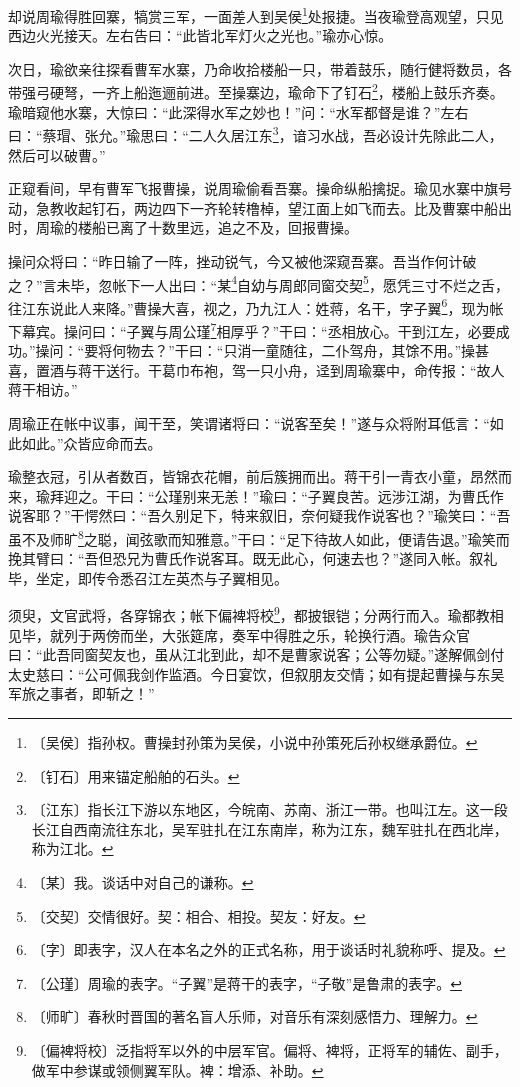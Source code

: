 \documentclass[12pt,UTF-8,openany]{ctexbook}
\begin{document}
\begin{normalsize}
    
    却说周瑜得胜回寨，犒赏三军，一面差人到吴侯\footnote{〔吴侯〕指孙权。曹操封孙策为吴侯，小说中孙策死后孙权继承爵位。}处报捷。当夜瑜登高观望，只见西边火光接天。左右告曰：“此皆北军灯火之光也。”瑜亦心惊。
    
    次日，瑜欲亲往探看曹军水寨，乃命收拾楼船一只，带着鼓乐，随行健将数员，各带强弓硬弩，一齐上船迤逦前进。至操寨边，瑜命下了钉石\footnote{〔钉石〕用来锚定船舶的石头。}，楼船上鼓乐齐奏。瑜暗窥他水寨，大惊曰：“此深得水军之妙也！”问：“水军都督是谁？”左右曰：“蔡瑁、张允。”瑜思曰：“二人久居江东\footnote{〔江东〕指长江下游以东地区，今皖南、苏南、浙江一带。也叫江左。这一段长江自西南流往东北，吴军驻扎在江东南岸，称为江东，魏军驻扎在西北岸，称为江北。}，谙习水战，吾必设计先除此二人，然后可以破曹。”
    
    正窥看间，早有曹军飞报曹操，说周瑜偷看吾寨。操命纵船擒捉。瑜见水寨中旗号动，急教收起钉石，两边四下一齐轮转橹棹，望江面上如飞而去。比及曹寨中船出时，周瑜的楼船已离了十数里远，追之不及，回报曹操。
    
    操问众将曰：“昨日输了一阵，挫动锐气，今又被他深窥吾寨。吾当作何计破之？”言未毕，忽帐下一人出曰：“某\footnote{〔某〕我。谈话中对自己的谦称。}自幼与周郎同窗交契\footnote{〔交契〕交情很好。契：相合、相投。契友：好友。}，愿凭三寸不烂之舌，往江东说此人来降。”曹操大喜，视之，乃九江人：姓蒋，名干，字子翼\footnote{〔字〕即表字，汉人在本名之外的正式名称，用于谈话时礼貌称呼、提及。}，现为帐下幕宾。操问曰：“子翼与周公瑾\footnote{〔公瑾〕周瑜的表字。“子翼”是蒋干的表字，“子敬”是鲁肃的表字。}相厚乎？”干曰：“丞相放心。干到江左，必要成功。”操问：“要将何物去？”干曰：“只消一童随往，二仆驾舟，其馀不用。”操甚喜，置酒与蒋干送行。干葛巾布袍，驾一只小舟，迳到周瑜寨中，命传报：“故人蒋干相访。”
    
    周瑜正在帐中议事，闻干至，笑谓诸将曰：“说客至矣！”遂与众将附耳低言：“如此如此。”众皆应命而去。
    
    瑜整衣冠，引从者数百，皆锦衣花帽，前后簇拥而出。蒋干引一青衣小童，昂然而来，瑜拜迎之。干曰：“公瑾别来无恙！”瑜曰：“子翼良苦。远涉江湖，为曹氏作说客耶？”干愕然曰：“吾久别足下，特来叙旧，奈何疑我作说客也？”瑜笑曰：“吾虽不及师旷\footnote{〔师旷〕春秋时晋国的著名盲人乐师，对音乐有深刻感悟力、理解力。}之聪，闻弦歌而知雅意。”干曰：“足下待故人如此，便请告退。”瑜笑而挽其臂曰：“吾但恐兄为曹氏作说客耳。既无此心，何速去也？”遂同入帐。叙礼毕，坐定，即传令悉召江左英杰与子翼相见。
    
    须臾，文官武将，各穿锦衣；帐下偏裨将校\footnote{〔偏裨将校〕泛指将军以外的中层军官。偏将、裨将，正将军的辅佐、副手，做军中参谋或领侧翼军队。裨：增添、补助。}，都披银铠；分两行而入。瑜都教相见毕，就列于两傍而坐，大张筵席，奏军中得胜之乐，轮换行酒。瑜告众官曰：“此吾同窗契友也，虽从江北到此，却不是曹家说客；公等勿疑。”遂解佩剑付太史慈曰：“公可佩我剑作监酒。今日宴饮，但叙朋友交情；如有提起曹操与东吴军旅之事者，即斩之！”
    

\end{normalsize}
\end{document}
